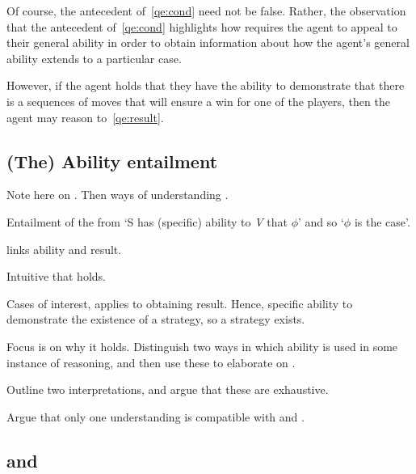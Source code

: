 \begin{note}
  Of course, the antecedent of~\ref{qe:cond} need not be false.
  Rather, the observation that the antecedent of~\ref{qe:cond} highlights how \GSI{} requires the agent to appeal to their general ability in order to obtain information about how the agent's general ability extends to a particular case.

  However, if the agent holds that they have the ability to demonstrate that there is a sequences of moves that will ensure a win for one of the players, then the agent may reason to~\ref{qe:result}.
\end{note}

\subsection{(The) Ability entailment}
\label{sec:ability-entailment}

\begin{note}[\aben{}]
  Note here on \aben{}.
  Then  ways of understanding \aben{}.

  \begin{proposition}
    Entailment of the from `S has (specific) ability to \emph{V} that \(\phi\)' and so `\(\phi\) is the case'.
  \end{proposition}

  \aben{} links ability and result.

  Intuitive that \aben{} holds.

  Cases of interest, \aben{} applies to obtaining result.
  Hence, specific ability to demonstrate the existence of a strategy, so a strategy exists.

  Focus is on why it holds.
  Distinguish two ways in which ability is used in some instance of reasoning, and then use these to elaborate on \aben{}.

  Outline two interpretations, and argue that these are exhaustive.

  Argue that only one understanding is compatible with \GSI{} and \aben{}.
\end{note}

\subsection{\WR{} and \AR{}}
\label{sec:wr-ar}

